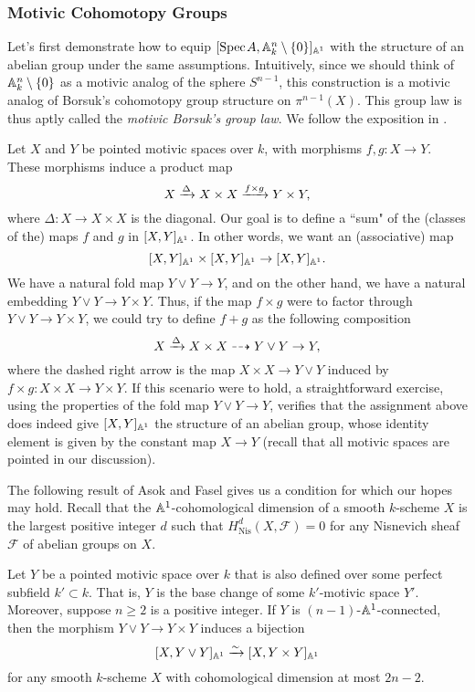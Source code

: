 \subsubsection{Motivic Cohomotopy Groups}

Let's first demonstrate how to equip $[\text{Spec}\hspace{0.1em} A, \mathbb{A}^n_k\setminus\{0\}]_{\mathbb{A}^1}$ with the structure of an abelian group under the same assumptions. Intuitively, since we should think of $\mathbb{A}^n_k\setminus\{0\}$ as a motivic analog of the sphere $S^{n-1}$, this construction is a motivic analog of Borsuk's cohomotopy group structure on $\pi^{n-1}(X)$. This group law is thus aptly called the \textit{motivic Borsuk's group law}. We follow the exposition in \cite[Section 4]{Lerbet}. 

Let $X$ and $Y$ be pointed motivic spaces over $k$, with morphisms $f,g: X \to Y$. These morphisms induce a product map
\[
X \xrightarrow{\Delta} X \times X \xrightarrow{f \times g} Y \times Y,
\]
where $\Delta: X \to X \times X$ is the diagonal. Our goal is to define a ``sum" of the (classes of the) maps $f$ and $g$ in $[X, Y]_{\mathbb{A}^1}$. In other words, we want an (associative) map 
\[
[X, Y]_{\mathbb{A}^1} \times [X, Y]_{\mathbb{A}^1} \to [X,Y]_{\mathbb{A}^1}. 
\]
We have a natural fold map $Y \vee Y \to Y$, and on the other hand, we have a natural embedding $Y \vee Y \to Y \times Y$. Thus, if the map $f \times g$ were to factor through $Y \vee Y \to Y \times Y$, we could try to define $f + g$ as the following composition
\[
X \xrightarrow{\Delta} X \times X \dashrightarrow Y \vee Y \to Y, 
\]
where the dashed right arrow is the map $X \times X \to Y \vee Y$ induced by $f \times g: X \times X \to Y \times Y$. If this scenario were to hold, a straightforward exercise, using the properties of the fold map $Y \vee Y \to Y$, verifies that the assignment above does indeed give $[X,Y]_{\mathbb{A}^1}$ the structure of an abelian group, whose identity element is given by the constant map $X \to Y$ (recall that all motivic spaces are pointed in our discussion). 

The following result of Asok and Fasel \cite[Proposition 1.2.3]{AF-JEMS} gives us a condition for which our hopes may hold. Recall that the $\mathbb{A}^1$-cohomological dimension of a smooth $k$-scheme $X$ is the largest positive integer $d$ such that $H^d_{\operatorname{Nis}}(X,\mathcal{F}) = 0$ for any Nisnevich sheaf $\mathcal{F}$ of abelian groups on $X$. 

\begin{theorem}\label{thm:af_group}
    Let $Y$ be a pointed motivic space over $k$ that is also defined over some perfect subfield $k' \subset k$. That is, $Y$ is the base change of some $k'$-motivic space $Y'$. Moreover, suppose $n \geq 2$ is a positive integer. If $Y$ is $(n-1)$-$\mathbb{A}^1$-connected, then the morphism $Y \vee Y \to Y \times Y$ induces a bijection
    \[
    [X, Y \vee Y]_{\mathbb{A}^1} \xrightarrow{\sim} [X, Y \times Y]_{\mathbb{A}^1}
    \]
    for any smooth $k$-scheme $X$ with cohomological dimension at most $2n-2$. 
\end{theorem}

